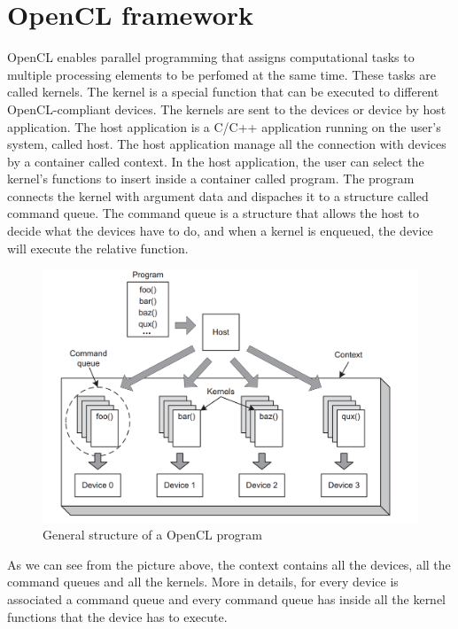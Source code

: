 \section{OpenCL framework}
OpenCL enables parallel programming that assigns computational tasks to multiple processing elements 
to be perfomed at the same time. These tasks are called kernels. The kernel is a special function that can be executed 
to different OpenCL-compliant devices. The kernels are sent to the devices or device by host application.
The host application is a C/C++ application running on the user's system, called host.
The host application manage all the connection with devices by a container called context. 
In the host application, the user can select the kernel's functions to insert inside a container called program.
The program connects the kernel with argument data and dispaches it to a structure called command queue.
The command queue is a structure that allows the host to decide what the devices have to do, and when a kernel is enqueued, the device 
will execute the relative function.

\begin{figure}[htp]
  \begin{center}
    \includegraphics[width=12cm]{./images/OpenCAL-CL/kernelDistribution.png}
    \caption{General structure of a OpenCL program}
    \label{fig:GeneralStructure}
  \end{center}
\end{figure}

As we can see from the picture above, the context contains all the devices, all the command queues and all the kernels.
More in details, for every device is associated a command queue and every command queue has inside all the kernel functions
that the device has to execute.

